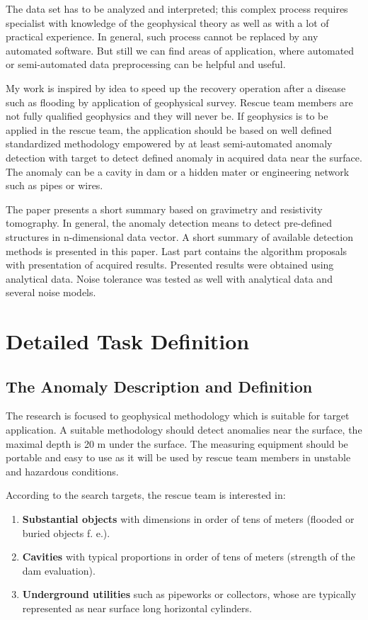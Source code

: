 \documentclass[FM]{tulthesis}
\begin{document}
The data set has to be analyzed and interpreted; this complex process requires specialist with knowledge of the geophysical theory as well as with a lot of practical experience. In general, such process cannot be replaced by any automated software. But still we can find areas of application, where automated or semi-automated data preprocessing can be helpful and useful. 

My work is inspired by idea to speed up the recovery operation after a disease such as flooding by application of geophysical survey. Rescue team members are not fully qualified geophysics and they will never be. If geophysics is to be applied in the rescue team, the application should be based on well defined standardized methodology empowered by at least semi-automated anomaly detection with target to detect defined anomaly in acquired data near the surface. The anomaly can be a cavity in dam or a hidden mater or engineering network such as pipes or wires. 

The paper presents a short summary based on gravimetry and resistivity tomography. In general, the anomaly detection means to detect pre-defined structures in n-dimensional data vector. A short summary of available detection methods is presented in this paper. Last part contains the algorithm proposals with presentation of acquired results. Presented results were obtained using analytical data. Noise tolerance was tested as well with analytical data and several noise models. 

\chapter{Detailed Task Definition} \label{chap:definition}

\section{The Anomaly Description and Definition} \label{sec:AnomalyDef}
The research is focused to geophysical methodology which is suitable for target application. A suitable methodology should detect anomalies near the surface, the maximal depth is 20 m under the surface. The measuring equipment should be portable and easy to use as it will be used by rescue team members in unstable and hazardous conditions. 

According to the search targets, the rescue team is interested in:

\begin{enumerate}
\item \textbf{Substantial objects} with dimensions in order of tens of meters (flooded or buried objects f. e.). 
\item \textbf{Cavities} with typical proportions in order of tens of meters (strength of the dam evaluation).
\item \textbf{Underground utilities} such as pipeworks or collectors, whose are typically represented as near surface long horizontal cylinders.
\end{enumerate}
\end{document}
